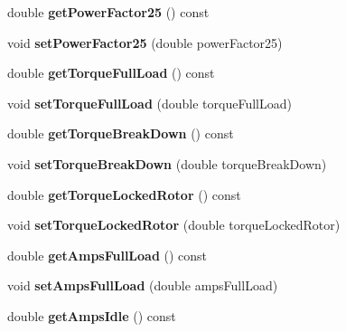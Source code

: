 \begin{DoxyCompactItemize}
double {\bfseries get\+Power\+Factor25} () const
\item 
\mbox{\label{class_motor_data_abf58c754c83b355e9b478401a441c4a2}} 
void {\bfseries set\+Power\+Factor25} (double power\+Factor25)
\item 
\mbox{\label{class_motor_data_a34d236d6b1ef4228e7dd0784bbd0245d}} 
double {\bfseries get\+Torque\+Full\+Load} () const
\item 
\mbox{\label{class_motor_data_a38e1656c9bdf7fda71bb38c8f84081db}} 
void {\bfseries set\+Torque\+Full\+Load} (double torque\+Full\+Load)
\item 
\mbox{\label{class_motor_data_a03eba622bcd69dc052e3627e00a8b6a3}} 
double {\bfseries get\+Torque\+Break\+Down} () const
\item 
\mbox{\label{class_motor_data_a7df7b610bdaf5681a5743b6c8c0f0113}} 
void {\bfseries set\+Torque\+Break\+Down} (double torque\+Break\+Down)
\item 
\mbox{\label{class_motor_data_a925ec8dd6c6211d3ed17eaf59a2b8d3a}} 
double {\bfseries get\+Torque\+Locked\+Rotor} () const
\item 
\mbox{\label{class_motor_data_abe381700b30c5c32cb321f549d00072b}} 
void {\bfseries set\+Torque\+Locked\+Rotor} (double torque\+Locked\+Rotor)
\item 
\mbox{\label{class_motor_data_afd764373f8aa8bfb0b5fd16cca6915b7}} 
double {\bfseries get\+Amps\+Full\+Load} () const
\item 
\mbox{\label{class_motor_data_ab57791b83a54024d08e7586fd271f8c3}} 
void {\bfseries set\+Amps\+Full\+Load} (double amps\+Full\+Load)
\item 
\mbox{\label{class_motor_data_a39f6771f83dbd65ae245f99b139a785a}} 
double {\bfseries get\+Amps\+Idle} () const
\item 
\mbox{\label{class_motor_data_ad59e05e9d308b797eb557714c7f24187}} 

\end{DoxyCompactItemize}
